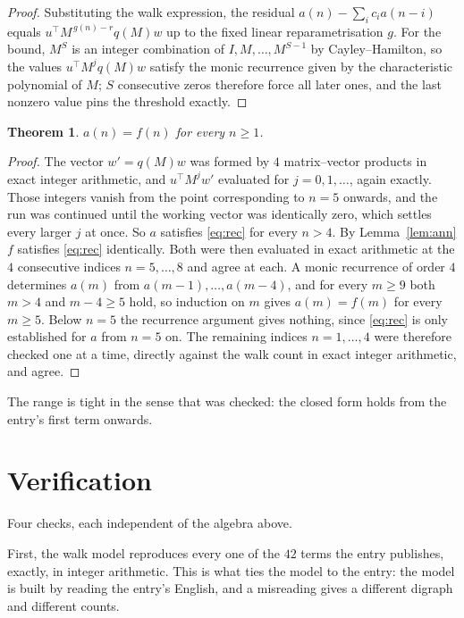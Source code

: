 \documentclass[11pt,a4paper]{article}
\theoremstyle{plain}
\newtheorem{theorem}{Theorem}
\theoremstyle{definition}
\begin{document}
\begin{proof}
Substituting the walk expression, the residual $a(n)-\sum_ic_ia(n-i)$ equals
$u^{\!\top}M^{\,g(n)-r}q(M)w$ up to the fixed linear reparametrisation $g$. For the bound,
$M^{S}$ is an integer combination of $I,M,\dots,M^{S-1}$ by Cayley--Hamilton, so the values
$u^{\!\top}M^{j}q(M)w$ satisfy the monic recurrence given by the characteristic polynomial of
$M$; $S$ consecutive zeros therefore force all later ones, and the last nonzero value pins the
threshold exactly.
\end{proof}

\begin{theorem}
$a(n)=f(n)$ for every $n\ge1$.
\end{theorem}

\begin{proof}
The vector $w'=q(M)w$ was formed by $4$ matrix--vector products in exact integer
arithmetic, and $u^{\!\top}M^{j}w'$ evaluated for $j=0,1,\dots$, again exactly. Those integers
vanish from the point corresponding to $n=5$ onwards, and the run was continued until the
working vector was identically zero, which settles every larger $j$ at once. So $a$ satisfies
\eqref{eq:rec} for every $n>4$. By Lemma~\ref{lem:ann} $f$ satisfies \eqref{eq:rec}
identically. Both were then evaluated in exact arithmetic at the $4$ consecutive indices
$n=5,\dots,8$ and agree at each. A monic recurrence of order $4$
determines $a(m)$ from $a(m-1),\dots,a(m-4)$, and for every $m\ge9$ both
$m>4$ and $m-4\ge5$ hold, so induction on $m$ gives $a(m)=f(m)$ for every
$m\ge5$.
Below $n=5$ the recurrence argument gives nothing, since \eqref{eq:rec} is only
established for $a$ from $n=5$ on. The remaining indices $n=1,\dots,4$ were
therefore checked one at a time, directly against the walk count in exact integer arithmetic,
and agree.
\end{proof}

The range is tight in the sense that was checked: the closed form holds from the entry's first term onwards.

\section{Verification}

Four checks, each independent of the algebra above.

First, the walk model reproduces every one of the $42$ terms the entry publishes,
exactly, in integer arithmetic. This is what ties the model to the entry: the model is built
by reading the entry's English, and a misreading gives a different digraph and different
counts.
\end{document}
